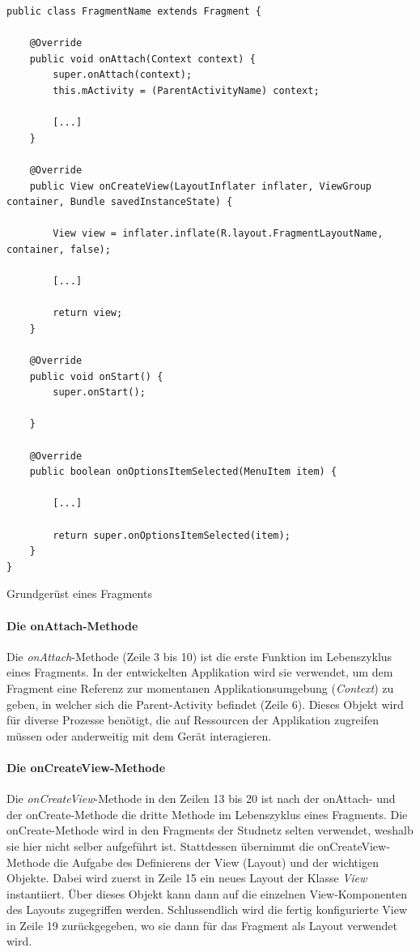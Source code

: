 \documentclass[../main.tex]{subfiles}
\begin{document}
	\begin{code}
		\begin{center}
			\begin{verbatim}
public class FragmentName extends Fragment {
			
	@Override
	public void onAttach(Context context) {
		super.onAttach(context);
		this.mActivity = (ParentActivityName) context;
		
		[...]
	}
	
	@Override
	public View onCreateView(LayoutInflater inflater, ViewGroup container, Bundle savedInstanceState) {
	
		View view = inflater.inflate(R.layout.FragmentLayoutName, container, false);

		[...]

		return view;
	}
			
	@Override
	public void onStart() {
		super.onStart();
	
	}
			
	@Override
	public boolean onOptionsItemSelected(MenuItem item) {
			
		[...]
			
		return super.onOptionsItemSelected(item);
	}
}	
			\end{verbatim}
			\caption{Grundgerüst eines Fragments}
			\label{fragmentStructure}
		\end{center}
		
	\end{code}

	\paragraph{Die onAttach-Methode}
	Die \emph{onAttach}-Methode (Zeile 3 bis 10) ist die erste Funktion im Lebenszyklus eines Fragments. In der entwickelten Applikation wird sie verwendet, um dem Fragment eine Referenz zur momentanen Applikationsumgebung (\emph{Context}) zu geben, in welcher sich die Parent-Activity befindet (Zeile 6). Dieses Objekt wird für diverse Prozesse benötigt, die auf Ressourcen der Applikation zugreifen müssen oder anderweitig mit dem Gerät interagieren.\cite{context}
	
	\paragraph{Die onCreateView-Methode}
	Die \emph{onCreateView}-Methode in den Zeilen 13 bis 20 ist nach der onAttach- und der onCreate-Methode die dritte Methode im Lebenszyklus eines Fragments. Die onCreate-Methode wird in den Fragments der Studnetz selten verwendet, weshalb sie hier nicht selber aufgeführt ist. Stattdessen übernimmt die onCreateView-Methode die Aufgabe des Definierens der View (Layout) und der wichtigen Objekte. Dabei wird zuerst in Zeile 15 ein neues Layout der Klasse \emph{View} instantiiert. Über dieses Objekt kann dann auf die einzelnen View-Komponenten des Layouts zugegriffen werden. Schlussendlich wird die fertig konfigurierte View in Zeile 19 zurückgegeben, wo sie dann für das Fragment als Layout verwendet wird.
	
\end{document}
